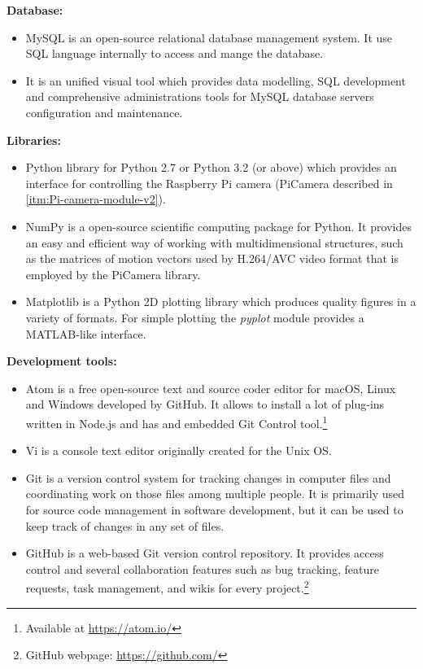 \textbf{Database:}
\begin{itemize}
	\item {} MySQL is an open-source relational database management system. It use \ac{SQL} language internally to access and mange the database.
	
	\item {} It is an unified visual tool which provides data modelling, SQL development and comprehensive administrations tools for MySQL database servers configuration and maintenance.  
	
\end{itemize}

\textbf{Libraries:}
\begin{itemize}
	\item {} Python library for Python 2.7 or Python 3.2 (or above) which provides an interface for controlling the Raspberry Pi camera (PiCamera described in \ref{itm:Pi-camera-module-v2}).
	
	\item {} NumPy is a open-source scientific computing package for Python. It provides an easy and efficient way of working with multidimensional structures, such as the matrices of motion vectors used by H.264/AVC video format that is employed by the PiCamera library.
	
	\item {} Matplotlib is a Python 2D plotting library which produces quality figures in a variety of formats. For simple plotting the \emph{pyplot} module provides a MATLAB-like interface.
	
\end{itemize}

\textbf{Development tools:}
\begin{itemize}
	\item {} Atom is a free open-source text and source coder editor for macOS, Linux and Windows developed by GitHub. It allows to install a lot of plug-ins written in Node.js and has and embedded Git Control tool.\footnote{Available at \url{https://atom.io/}}
	
	\item {} Vi is a console text editor originally created for the Unix \ac{OS}. 
	
	\item {} Git is a version control system for tracking changes in computer files and coordinating work on those files among multiple people. It is primarily used for source code management in software development, but it can be used to keep track of changes in any set of files.
	
	\item {} GitHub is a web-based Git version control repository. It provides access control and several collaboration features such as bug tracking, feature requests, task management, and wikis for every project.\footnote{GitHub webpage: \url{https://github.com/}}	
	
\end{itemize}

